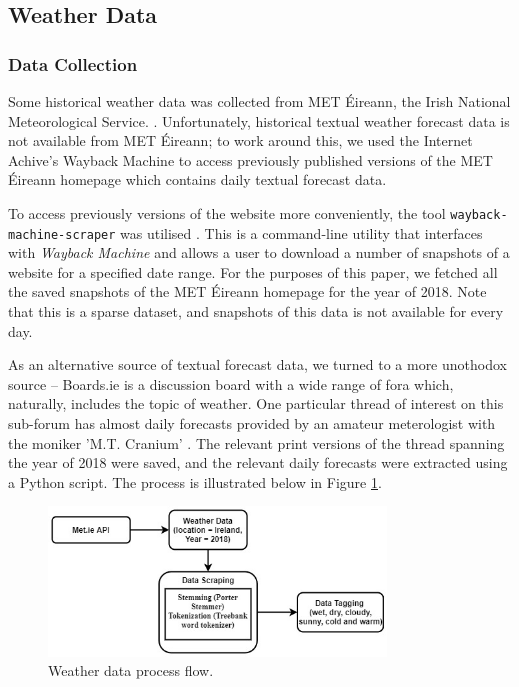 \documentclass[a4paper,10pt]{article}
\begin{document}
    \subsection{Weather Data}

    \subsubsection{Data Collection}

    Some historical weather data was collected from MET \'{E}ireann, the Irish National Meteorological Service. . Unfortunately, historical textual weather forecast data is not available from MET \'{E}ireann; to work around this, we used the Internet Achive's Wayback Machine  to access previously published versions of the MET \'{E}ireann homepage which contains daily textual forecast data.

    To access previously versions of the website more conveniently, the tool \texttt{wayback-machine-scraper} was utilised . This is a command-line utility that interfaces with \textit{Wayback Machine} and allows a user to download a number of snapshots of a website for a specified date range. For the purposes of this paper, we fetched all the saved snapshots of the MET \'{E}ireann homepage for the year of 2018. Note that this is a sparse dataset, and snapshots of this data is not available for every day.

    As an alternative source of textual forecast data, we turned to a more unothodox source -- Boards.ie is a discussion board with a wide range of fora which, naturally, includes the topic of weather. One particular thread of interest on this sub-forum has almost daily forecasts provided by an amateur meterologist with the moniker 'M.T. Cranium' . The relevant print versions of the thread spanning the year of 2018 were saved, and the relevant daily forecasts were extracted using a Python script. The process is illustrated below in Figure \ref{fig:weather_process_flow}.

    \begin{figure}
        \includegraphics[width=0.8\textwidth]{weather_process_flow.jpeg}
        \caption{Weather data process flow.}
        \label{fig:weather_process_flow}
    \end{figure}
\end{document}
